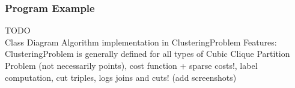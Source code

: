 \begin{frame}
    \frametitle{Program Example}
    TODO\\
    Class Diagram
    Algorithm implementation in ClusteringProblem
    Features: ClusteringProblem is generally defined for all types of Cubic Clique Partition Problem (not necessarily points),
        cost function + sparse costs!, label computation, cut triples,
        logs joins and cuts! (add screenshots)
\end{frame}





